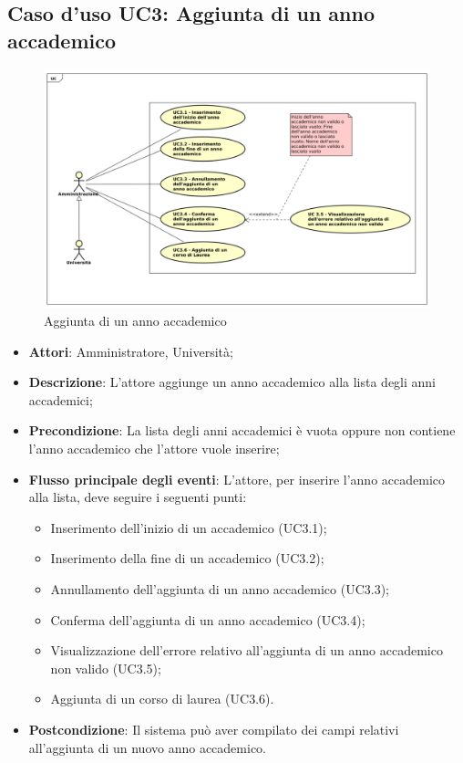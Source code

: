 \subsection{Caso d'uso \texorpdfstring{UC3}{UC3}: Aggiunta di un anno accademico}
\begin{figure} [H]
	\centering
	\includegraphics[scale=0.45]{./img/UC3.pdf}
	\caption{Aggiunta di un anno accademico}\label{}
\end{figure}
\begin{itemize}
	\item \textbf{Attori}: Amministratore, Università;
	\item \textbf{Descrizione}: L'attore aggiunge un anno accademico alla lista degli anni accademici;
	\item \textbf{Precondizione}: La lista degli anni accademici è vuota oppure non contiene l'anno accademico che l'attore vuole inserire;
	\item \textbf{Flusso principale degli eventi}: L'attore, per inserire l'anno accademico alla lista, deve seguire i seguenti punti:
	\begin{itemize}
		\item Inserimento dell'inizio di un accademico (UC3.1);
		\item Inserimento della fine di un accademico (UC3.2);
		\item Annullamento dell'aggiunta di un anno accademico (UC3.3);
		\item Conferma dell'aggiunta di un anno accademico (UC3.4);
		\item Visualizzazione dell'errore relativo all'aggiunta di un anno accademico non valido (UC3.5);
		\item Aggiunta di un corso di laurea (UC3.6).
	\end{itemize}
	\item \textbf{Postcondizione}: Il sistema può aver compilato dei campi relativi all'aggiunta di un nuovo anno accademico.
\end{itemize}
